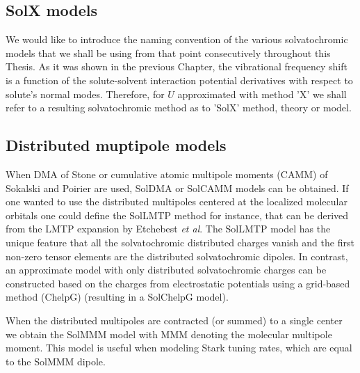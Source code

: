 \documentclass[a4paper,titlepage,twoside,fleqn,12pt]{book}
\begin{document}
\begin{refsection}
\section{SolX models}

We would like to introduce the naming convention 
of the various solvatochromic models
that we shall be using from that point 
consecutively throughout this Thesis. As it was
shown in the previous Chapter, the vibrational frequency shift is a function
of the solute\hyp{}solvent interaction potential derivatives
with respect to solute's normal modes. Therefore, for $U$ approximated
with method 'X' we shall refer to
a resulting solvatochromic method as to 'SolX' method, theory or model. 

\subsection{Distributed muptipole models}

When DMA of Stone\citep{Stone.JCTC.2005} or cumulative atomic multipole
moments (CAMM) of Sokalski and Poirier\citep{Sokalski.Poirier.CPL.1983} are used,
SolDMA or SolCAMM models can be obtained. 
If one wanted to use the distributed multipoles centered at the localized molecular orbitals
one could define the SolLMTP method for instance, that can be derived 
from the LMTP expansion by Etchebest \emph{et al}.\citep{Etchebest.Lavery.Pullman.TheorChimActa.1982}
The SolLMTP model has the unique feature that all the solvatochromic 
distributed charges vanish and the first non\hyp{}zero tensor elements
are the distributed solvatochromic dipoles. In contrast, an approximate model 
with only distributed solvatochromic charges can be constructed based on the
charges from electrostatic potentials using a grid\hyp{}based 
method\citep{Breneman.Wiberg.JCC.1990} (ChelpG)
(resulting in a SolChelpG model).

When the distributed multipoles are contracted (or summed)
to a single center we obtain the SolMMM model with MMM denoting 
the molecular multipole moment. This model is useful when
modeling Stark tuning rates, which are equal to
the SolMMM dipole.


\end{refsection}
\end{document}
